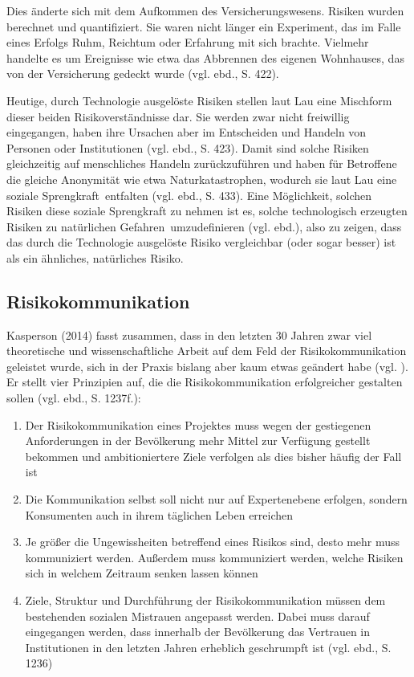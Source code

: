 Dies änderte sich mit dem Aufkommen des Versicherungswesens. Risiken wurden berechnet und quantifiziert. Sie waren nicht länger ein \glq Experiment\grq , das im Falle eines Erfolgs Ruhm, Reichtum oder Erfahrung mit sich brachte. Vielmehr handelte es um Ereignisse wie etwa das Abbrennen des eigenen Wohnhauses, das von der Versicherung gedeckt wurde (vgl. ebd., S. 422).

Heutige, durch Technologie ausgelöste Risiken stellen laut Lau eine Mischform dieser beiden Risikoverständnisse dar. Sie werden zwar nicht freiwillig eingegangen, haben ihre Ursachen aber im Entscheiden und Handeln von Personen oder Institutionen (vgl. ebd., S. 423). Damit sind solche Risiken gleichzeitig auf menschliches Handeln zurückzuführen und haben für Betroffene die gleiche Anonymität wie etwa Naturkatastrophen, wodurch sie laut Lau eine \glqq soziale Sprengkraft\grqq \, entfalten (vgl. ebd., S. 433). Eine Möglichkeit, solchen Risiken diese soziale Sprengkraft zu nehmen ist es, solche technologisch erzeugten Risiken zu \glq natürlichen Gefahren\grq \, umzudefinieren (vgl. ebd.), also zu zeigen, dass das durch die Technologie ausgelöste Risiko vergleichbar (oder sogar besser) ist als ein ähnliches, natürliches Risiko.



\subsection{Risikokommunikation}
Kasperson (2014) fasst zusammen, dass in den letzten 30 Jahren zwar viel theoretische und wissenschaftliche Arbeit auf dem Feld der Risikokommunikation geleistet wurde, sich in der Praxis bislang aber kaum etwas geändert habe (vgl. \cite[1234]{kasperson2014four}). Er stellt vier Prinzipien auf, die die Risikokommunikation erfolgreicher gestalten sollen (vgl. ebd., S. 1237f.):
\begin{enumerate}
  \item Der Risikokommunikation eines Projektes muss wegen der gestiegenen Anforderungen in der Bevölkerung mehr Mittel zur Verfügung gestellt bekommen und ambitioniertere Ziele verfolgen als dies bisher häufig der Fall ist
  \item Die Kommunikation selbst soll nicht nur auf Expertenebene erfolgen, sondern Konsumenten auch in ihrem täglichen Leben erreichen
  \item Je größer die Ungewissheiten betreffend eines Risikos sind, desto mehr muss kommuniziert werden. Außerdem muss kommuniziert werden, welche Risiken sich in welchem Zeitraum senken lassen können
  \item Ziele, Struktur und Durchführung der Risikokommunikation müssen dem bestehenden sozialen Mistrauen angepasst werden. Dabei muss darauf eingegangen werden, dass innerhalb der Bevölkerung das Vertrauen in Institutionen in den letzten Jahren erheblich geschrumpft ist (vgl. ebd., S. 1236)
\end{enumerate}


